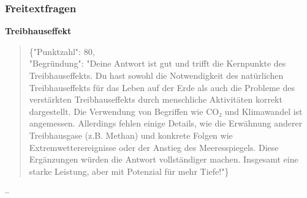 \documentclass[a4paper,12pt]{article}
\begin{document}
\subsubsection{Freitextfragen}

\textbf{Treibhauseffekt}
\begin{quote}
\{"Punktzahl": 80,\\
"Begründung": "Deine Antwort ist gut und trifft die Kernpunkte des Treibhauseffekts. Du hast sowohl die Notwendigkeit des natürlichen Treibhauseffekts für das Leben auf der Erde als auch die Probleme des verstärkten Treibhauseffekts durch menschliche Aktivitäten korrekt dargestellt. Die Verwendung von Begriffen wie CO₂ und Klimawandel ist angemessen. Allerdings fehlen einige Details, wie die Erwähnung anderer Treibhausgase (z.B. Methan) und konkrete Folgen wie Extremwetterereignisse oder der Anstieg des Meeresspiegels. Diese Ergänzungen würden die Antwort vollständiger machen. Insgesamt eine starke Leistung, aber mit Potenzial für mehr Tiefe!"\}
\end{quote}–

\newpage

\nocite{*}
\printbibliography
\end{document}
